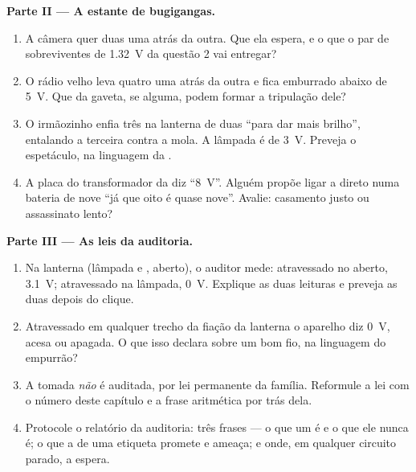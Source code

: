 \begin{problem}
\medskip\noindent\textbf{Parte II --- A estante de bugigangas.}
\begin{enumerate}[resume]
  \item A câmera quer duas  uma atrás da outra. Que  ela
        espera, e o que o par de sobreviventes de \qty{1.32}{V} da
        questão 2 vai entregar?
  \item O rádio velho leva quatro  uma atrás da outra e fica
        emburrado abaixo de \qty{5}{V}. Que  da gaveta, se
        alguma, podem formar a tripulação dele?
  \item O irmãozinho enfia três  na lanterna de duas ``para dar
        mais brilho'', entalando a terceira contra a mola. A lâmpada
        é de \qty{3}{V}. Preveja o espetáculo, na linguagem da .
  \item A placa do transformador da  diz ``\qty{8}{V}''.
        Alguém propõe ligar a  direto numa bateria de nove
         ``já que oito é quase nove''. Avalie: casamento justo
        ou assassinato lento?
\end{enumerate}

\medskip\noindent\textbf{Parte III --- As leis da auditoria.}
\begin{enumerate}[resume]
  \item Na lanterna (lâmpada e  ,  aberto),
        o auditor mede: atravessado no  aberto,
        \qty{3.1}{V}; atravessado na lâmpada, \qty{0}{V}. Explique as
        duas leituras e preveja as duas depois do clique.
  \item Atravessado em qualquer trecho da fiação da lanterna o
        aparelho diz \qty{0}{V}, acesa ou apagada. O que isso declara
        sobre um bom fio, na linguagem do empurrão?
  \item A tomada \emph{não} é auditada, por lei permanente da
        família. Reformule a lei com o número deste capítulo e a
        frase aritmética por trás dela.
  \item Protocole o relatório da auditoria: três frases --- o que um
         é e o que ele nunca é; o que a  de
        uma etiqueta promete e ameaça; e onde, em qualquer circuito
        parado, a  espera.
\end{enumerate}
\end{problem}
